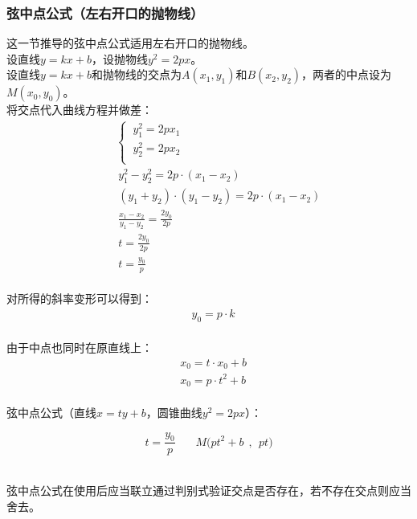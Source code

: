 \documentclass[UTF8]{ctexart}
\begin{document}
\subsubsection{弦中点公式（左右开口的抛物线）}
    \setcounter{equation}{0}
    这一节推导的弦中点公式适用左右开口的抛物线。\\[3mm]
    设直线$y=kx+b$，设抛物线$y^2=2px$。\\[3mm]
    设直线$y=kx+b$和抛物线的交点为$A(x_1,y_1)$和$B(x_2,y_2)$，两者的中点设为$M(x_0,y_0)$。\\[6mm]
    将交点代入曲线方程并做差：\vspace{5pt}
    \begin{align}
        &~~~~\begin{cases}
            ~y_1^2=2px_1\\[1mm]
            ~y_2^2=2px_2\\[1mm]
        \end{cases}\\[3mm]
        &~~~~~y_1^2-y_2^2=2p\cdot(x_1-x_2)\\[3mm]
        &~~~~~(y_1+y_2)\cdot(y_1-y_2)=2p\cdot(x_1-x_2)\\[3mm]
        &~~~~~\frac{x_1-x_2}{y_1-y_2}=\frac{2y_0}{2p}\\[3mm]
        &~~~~~t=\frac{2y_0}{2p}\\[3mm]
        &~~~~~t=\frac{y_0}{p}
    \end{align}\\
    对所得的斜率变形可以得到：
    \begin{align}
        &y_0=p\cdot k
    \end{align}\\
    由于中点也同时在原直线上：
    \begin{align}
        &x_0=t\cdot x_0+b\\[3mm]
        &x_0=p\cdot t^2+b
    \end{align}\\
    弦中点公式（直线$x=ty+b$，圆锥曲线$y^2=2px$）：
    \begin{large}
        \begin{equation*}
            t=\frac{y_0}{p}~~~~~~~~M\big(pt^2+b~~,~~pt\big)
        \end{equation*}
    \end{large}\\
    弦中点公式在使用后应当联立通过判别式验证交点是否存在，若不存在交点则应当舍去。

\newpage

\newpage
\end{document}
